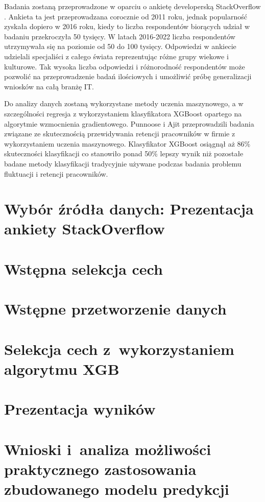 Badania zostaną przeprowadzone w oparciu o ankietę developerską StackOverflow \cite{so-survey-info}.
Ankieta ta jest przeprowadzana corocznie od 2011 roku, jednak popularność zyskała dopiero w 2016 roku, kiedy to liczba respondentów biorących udział w badaniu przekroczyła 50 tysięcy.
W latach 2016-2022 liczba respondentów utrzymywała się na poziomie od 50 do 100 tysięcy.
Odpowiedzi w ankiecie udzielali specjaliści z całego świata reprezentując różne grupy wiekowe i kulturowe.
Tak wysoka liczba odpowiedzi i różnorodność respondentów może pozwolić na przeprowadzenie badań ilościowych i umożliwić próbę generalizacji wniosków na całą branżę IT.


Do analizy danych zostaną wykorzystane metody uczenia maszynowego, a w szczególności regresja z wykorzystaniem klasyfikatora XGBoost opartego na algorytmie wzmocnienia gradientowego.
Punnoose i Ajit \cite{punnoose-2016} przeprowadzili badania związane ze skutecznością przewidywania retencji pracowników w firmie z wykorzystaniem uczenia maszynowego.
Klasyfikator XGBoost osiągnął aż 86\% skuteczności klasyfikacji co stanowiło ponad 50\% lepszy wynik niż pozostałe badane metody klasyfikacji tradycyjnie używane podczas badania problemu fluktuacji i retencji pracowników.

\section{Wybór źródła danych: Prezentacja ankiety StackOverflow}\label{sec:analysis:data-source-selection}
\section{Wstępna selekcja cech}\label{sec:analysis:feature-pre-selection}
\section{Wstępne przetworzenie danych}\label{sec:analysis:preprocessing}
\section{Selekcja cech z~wykorzystaniem algorytmu XGB}\label{sec:analysis:feature-selection-xgb}
\section{Prezentacja wyników}\label{sec:analysis:important-features}
\todo{}
\section{Wnioski i~analiza możliwości praktycznego zastosowania zbudowanego modelu predykcji}\label{sec:analysis:model-fitness}

\thispagestyle{normal}
